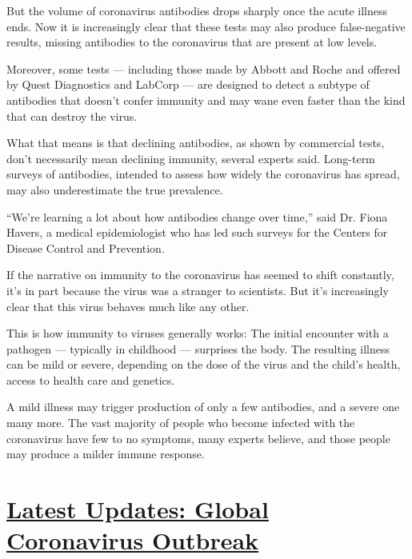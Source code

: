 But the volume of coronavirus antibodies drops sharply once the acute
illness ends. Now it is increasingly clear that these tests may also
produce false-negative results, missing antibodies to the coronavirus
that are present at low levels.

Moreover, some tests --- including those made by Abbott and Roche and
offered by Quest Diagnostics and LabCorp --- are designed to detect a
subtype of antibodies that doesn't confer immunity and may wane even
faster than the kind that can destroy the virus.

What that means is that declining antibodies, as shown by commercial
tests, don't necessarily mean declining immunity, several experts said.
Long-term surveys of antibodies, intended to assess how widely the
coronavirus has spread, may also underestimate the true prevalence.

``We're learning a lot about how antibodies change over time,'' said Dr.
Fiona Havers, a medical epidemiologist who has led such surveys for the
Centers for Disease Control and Prevention.

If the narrative on immunity to the coronavirus has seemed to shift
constantly, it's in part because the virus was a stranger to scientists.
But it's increasingly clear that this virus behaves much like any other.

This is how immunity to viruses generally works: The initial encounter
with a pathogen --- typically in childhood --- surprises the body. The
resulting illness can be mild or severe, depending on the dose of the
virus and the child's health, access to health care and genetics.

A mild illness may trigger production of only a few antibodies, and a
severe one many more. The vast majority of people who become infected
with the coronavirus have few to no symptoms, many experts believe, and
those people may produce a milder immune response.

\hypertarget{latest-updates-global-coronavirus-outbreak}{%
\section{\texorpdfstring{\href{https://www.nytimes.com/2020/08/04/world/coronavirus-cases.html?action=click\&pgtype=Article\&state=default\&region=MAIN_CONTENT_1\&context=storylines_live_updates}{Latest
Updates: Global Coronavirus
Outbreak}}{Latest Updates: Global Coronavirus Outbreak}}\label{latest-updates-global-coronavirus-outbreak}}

